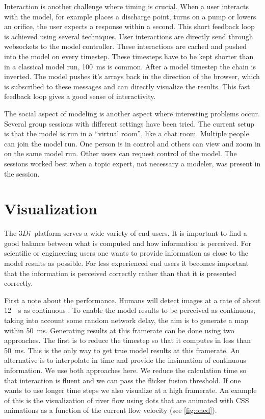 \documentclass[a4paper]{article}
\DeclareRobustCommand{\threedi}{$3Di$~}
\begin{document}
Interaction is another challenge where timing is crucial. When a user interacts with the model, for example places a discharge point, turns on a pump or lowers an orifice, the user expects a response within a second. This short feedback loop is achieved using several techniques. User interactions are directly send through websockets \citep{Hickson2012} to the model controller. These interactions are cached and pushed into the model on every timestep. These timesteps have to be kept shorter than in a classical model run, \SI{100}{\milli\second} is common. After a model timestep the chain is inverted. The model pushes it's arrays back in the direction of the browser, which is subscribed to these messages and can directly visualize the results. This fast feedback loop gives a good sense of interactivity.

The social aspect of modeling is another aspect where interesting problems occur. Several group sessions with different settings have been tried. The current setup is that the model is run in a ``virtual room'', like a chat room. Multiple people can join the model run. One person is in control and others can view and zoom in on the same model run. Other users can request control of the model. The sessions worked best when a topic expert, not necessary a modeler, was present in the session.

\section{Visualization}
The \threedi platform serves a wide variety of end-users. It is important to find a good balance between what is computed and how information is perceived. For scientific or engineering users one wants to provide information as close to the model results as possible. For less experienced end users it becomes important that the information is perceived correctly rather than that it is presented correctly.

First a note about the performance. Humans will detect images at a rate of about \SI{12}{\per\second} as continuous \citep{Landis1954}. To enable the model results to be perceived as continuous, taking into account some random network delay, the aim is to generate a map within \SI{50}{\milli\second}. Generating results at this framerate can be done using two approaches. The first is to reduce the timestep so that it computes in less than \SI{50}{\milli\second}. This is the only way to get true model results at this framerate. An alternative is to interpolate in time and provide the insinuation of continuous information. We use both approaches here. We reduce the calculation time so that interaction is fluent and we can pass the flicker fusion threshold. If one wants to use longer time steps we also visualize at a high framerate. An example of this is the visualization of river flow using dots that are animated with \ac{CSS} animations as a function of the current flow velocity (see \autoref{fig:oned}).
\end{document}
